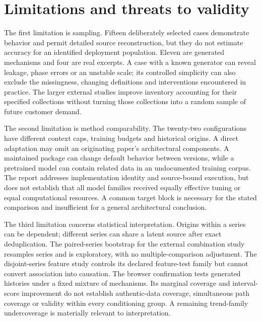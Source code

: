 \section{Limitations and threats to validity}
The first limitation is sampling. Fifteen deliberately selected cases demonstrate behavior and permit detailed source reconstruction, but they do not estimate accuracy for an identified deployment population. Eleven are generated mechanisms and four are real excerpts. A case with a known generator can reveal leakage, phase errors or an unstable scale; its controlled simplicity can also exclude the missingness, changing definitions and interventions encountered in practice. The larger external studies improve inventory accounting for their specified collections without turning those collections into a random sample of future customer demand.

The second limitation is method comparability. The twenty-two configurations have different context caps, training budgets and historical origins. A direct adaptation may omit an originating paper's architectural components. A maintained package can change default behavior between versions, while a pretrained model can contain related data in an undocumented training corpus. The report addresses implementation identity and source-bound execution, but does not establish that all model families received equally effective tuning or equal computational resources. A common target block is necessary for the stated comparison and insufficient for a general architectural conclusion.

The third limitation concerns statistical interpretation. Origins within a series can be dependent; different series can share a latent source after exact deduplication. The paired-series bootstrap for the external combination study resamples series and is exploratory, with no multiple-comparison adjustment. The disjoint-series feature study controls its declared feature-test family but cannot convert association into causation. The browser confirmation tests generated histories under a fixed mixture of mechanisms. Its marginal coverage and interval-score improvement do not establish authentic-data coverage, simultaneous path coverage or validity within every conditioning group. A remaining trend-family undercoverage is materially relevant to interpretation.

